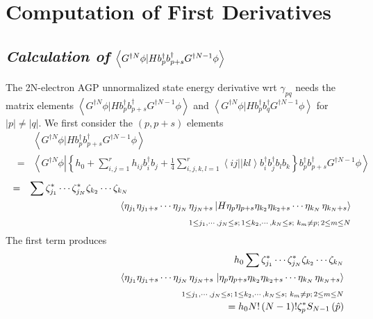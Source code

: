 \documentclass{article}
\begin{document}
\section{Computation of First Derivatives}

\subsection{\textit{Calculation of} $\left\langle G^{\dagger N}\protect\phi %
|Hb_{p}^{\dagger }b_{p+s}^{\dagger }G^{\dagger N-1}\protect\phi %
\right\rangle $}

The 2N-electron AGP unnormalized state energy derivative wrt $\gamma _{pq}$
needs the matrix elements $\left\langle G^{\dagger N}\phi |Hb_{p}^{\dagger
}b_{p+s}^{\dagger }G^{\dagger N-1}\phi \right\rangle $ and $\left\langle
G^{\dagger N}\phi |Hb_{p}^{\dagger }b_{q}^{\dagger }G^{\dagger N-1}\phi
\right\rangle $ for $\left| p\right| \neq \left| q\right| $. We first
consider the $\left( p,p+s\right) $ elements 
\begin{eqnarray*}
&&\left\langle G^{\dagger N}\phi |Hb_{p}^{\dagger }b_{p+s}^{\dagger
}G^{\dagger N-1}\phi \right\rangle \quad \qquad \qquad \qquad \qquad \qquad
\qquad \qquad \qquad \qquad \qquad \qquad \qquad \quad \\
&=&\left\langle G^{\dagger N}\phi \left| \left\{
h_{0}+\sum_{i,j=1}^{r}h_{ij}b_{i}^{\dagger }b_{j}+\frac{1}{4}%
\sum_{i,j,k,l=1}^{r}\left\langle ij||kl\right\rangle b_{i}^{\dagger
}b_{j}^{\dagger }b_{l}b_{k}\right\} b_{p}^{\dagger }b_{p+s}^{\dagger
}G^{\dagger N-1}\phi \right. \right\rangle
\end{eqnarray*}%
\begin{eqnarray}
&=&\sum \zeta _{j_{1}}^{\ast }\cdots \zeta _{j_{N}}^{\ast }\zeta
_{k_{2}}\cdots \zeta _{k_{N}}\qquad \qquad \qquad \qquad \qquad \qquad
\qquad \qquad \qquad \qquad \qquad \quad  \notag \\
&&\qquad \qquad \quad \qquad \langle \eta _{j_{1}}\eta _{j_{1}+s}\cdots \eta
_{j_{N}\,}\eta _{j_{N}+s}\left| H\eta _{p}\eta _{p+s}\eta _{k_{2}}\eta
_{k_{2}+s}\cdots \eta _{k_{N}\,}\eta _{k_{N}+s}\right\rangle  \notag \\
&&\qquad \qquad \qquad \qquad \qquad \qquad \qquad \qquad _{1\leq
j_{1},\cdots ,j_{N}\leq s;\,1\leq k_{2},\cdots ,k_{N}\leq s;\,\,k_{m}\neq
p;\,2\leq m\leq N}
\end{eqnarray}%
The first term produces 
\begin{eqnarray}
&&h_{0}\sum \zeta _{j_{1}}^{\ast }\cdots \zeta _{j_{N}}^{\ast }\zeta
_{k_{2}}\cdots \zeta _{k_{N}}  \notag \\
&&\qquad \qquad \left\langle \eta _{j_{1}}\eta _{j_{1}+s}\cdots \eta
_{j_{N}\,}\eta _{j_{N}+s}\right. \left| \eta _{p}\eta _{p+s}\eta
_{k_{2}}\eta _{k_{2}+s}\cdots \eta _{k_{N}\,}\eta _{k_{N}+s}\right\rangle 
\notag \\
&&\qquad \qquad \qquad \qquad \qquad \qquad \qquad \qquad _{1\leq
j_{1},\cdots ,j_{N}\leq s;\,1\leq k_{2},\cdots ,k_{N}\leq s;\,\,k_{m}\neq
p;\,2\leq m\leq N}  \notag \\
&&\left. {}\right. =h_{0}N!\left( N-1\right) !\zeta _{p}^{\ast
}S_{N-1}\left( \hat{p}\right)
\end{eqnarray}%
\end{document}
